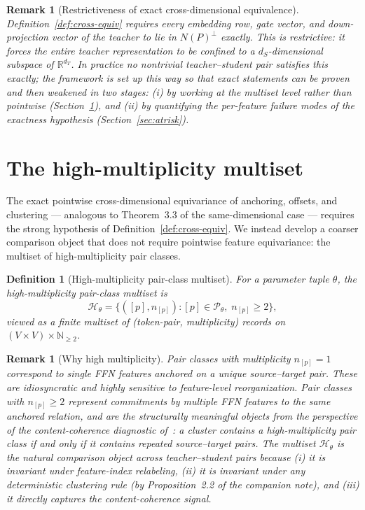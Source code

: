 \documentclass{article}
\newtheorem{definition}[theorem]{Definition}
\newtheorem{remark}[theorem]{Remark}
\newcommand{\Hmult}[1]{\mathcal{H}_{#1}}
\begin{document}
\begin{remark}[Restrictiveness of exact cross-dimensional equivalence]
	\label{rem:restrictive}
	Definition~\ref{def:cross-equiv} requires every embedding row, gate vector, and down-projection vector of the teacher to lie in $N(P)^\perp$ exactly. This is restrictive: it forces the entire teacher representation to be confined to a $d_S$-dimensional subspace of $\mathbb{R}^{d_T}$. In practice no nontrivial teacher--student pair satisfies this exactly; the framework is set up this way so that exact statements can be proven and then weakened in two stages: (i) by working at the multiset level rather than pointwise (Section~\ref{sec:multiset}), and (ii) by quantifying the per-feature failure modes of the exactness hypothesis (Section~\ref{sec:atrisk}).
\end{remark}

\section{The high-multiplicity multiset}
\label{sec:multiset}

The exact pointwise cross-dimensional equivariance of anchoring, offsets, and clustering --- analogous to Theorem~3.3 of the same-dimensional case --- requires the strong hypothesis of Definition~\ref{def:cross-equiv}. We instead develop a coarser comparison object that does not require pointwise feature equivariance: the multiset of high-multiplicity pair classes.

\begin{definition}[High-multiplicity pair-class multiset]
	\label{def:H-multiset}
	For a parameter tuple $\theta$, the \emph{high-multiplicity pair-class multiset} is
	\[
		\Hmult{\theta} = \big\{ ([p], n_{[p]}) : [p] \in \mathcal{P}_\theta, \; n_{[p]} \geq 2 \big\},
	\]
	viewed as a finite multiset of (token-pair, multiplicity) records on $(V \times V) \times \mathbb{N}_{\geq 2}$.
\end{definition}

\begin{remark}[Why high multiplicity]
	\label{rem:why-high-mult}
	Pair classes with multiplicity $n_{[p]} = 1$ correspond to single FFN features anchored on a unique source--target pair. These are idiosyncratic and highly sensitive to feature-level reorganization. Pair classes with $n_{[p]} \geq 2$ represent commitments by multiple FFN features to the same anchored relation, and are the structurally meaningful objects from the perspective of the content-coherence diagnostic of~\citep{cluster_size_confound}: a cluster contains a high-multiplicity pair class if and only if it contains repeated source--target pairs. The multiset $\Hmult{\theta}$ is the natural comparison object across teacher--student pairs because (i) it is invariant under feature-index relabeling, (ii) it is invariant under any deterministic clustering rule (by Proposition~2.2 of the companion note), and (iii) it directly captures the content-coherence signal.
\end{remark}
\end{document}
